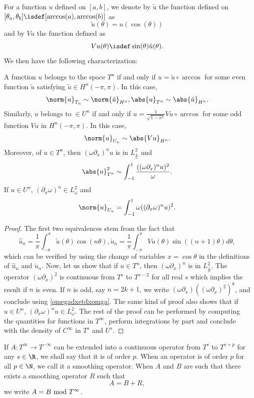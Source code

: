 \documentclass[a4paper]{article}
\begin{document}
	For a function $u$ defined on $[a,b]$, we denote by $\tilde{u}$ the function defined on $[\theta_a,\theta_b] \isdef [\arccos(a),\arccos(b)]$ as
	\[ \tilde{u}(\theta) = u(\cos(\theta))\]
	and by $Vu$ the function defined as 
	\[Vu(\theta) \isdef \sin(\theta) \tilde{u}(\theta).\]
	We then have the following characterization:
	\begin{The}
		A function $u$ belongs to the space $T^n$ if and only if $u = \tilde{u} \circ \arccos$ for some even function $\tilde{u}$ satisfying $\tilde{u}\in H^n(-\pi,\pi)$. In this case, 
		\[ \norm{u}_{T_n}\sim \norm{\tilde{u}}_{H^n}, \abs{u}_{T^n} \sim \abs{\tilde{u}}_{H^n}.\]
		Similarly, $u$ belongs to  $\in U^n$ if and only if $ u = \frac{1}{\sqrt{1 - x^2}} Vu  \circ  \arccos$  for some odd function $Vu$ in  $H^n(-\pi,\pi)$. In this case, 
		\[\norm{u}_{U_n} \sim \abs{Vu}_{H^n}.\]	
		Moreover, of $ u \in T^n$, then $(\omega \partial_x)^n u$ is in $L^2_\frac{1}{\omega}$ and 
		\[ \abs{u}_{T^n}^2 \sim \int_{-1}^{1} \frac{((\omega \partial_x)^n u)^2}{\omega}.\]
		\noindent If $u \in U^n$, $(\partial_x \omega)^n \in L^2_\omega$ and 
		\[ \norm{u}_{U_n} = \int_{-1}^{1}\omega ((\partial_x \omega)^n u)^2.\]
		\label{thmChar}
	\end{The}
	\begin{proof}
		The first two equivalences stem from the fact that 
		\[\hat{u}_n = \frac{1}{\pi}\int_{-\pi}^{\pi} \tilde{u}(\theta) \cos(n \theta), \check{u}_n = \frac{1}{\pi} \int_{-\pi}^{\pi} Vu(\theta) \sin((n+1)\theta)d\theta,\]
		which can be verified by using the change of variables $x = \cos\theta$ in the definitions of $\hat{u}_n$ and $\check{u}_n$. 
		Now, let us show that if $ u \in T^n$, then $(\omega \partial_x)^n$ is in $L^2_\frac{1}{\omega}$. The operator $(\omega \partial_x)^2$ is continuous from $T^s$ to $T^{s-2}$ for all real $s$ which implies the result if $n$ is even. If $n$ is odd, say $n = 2k + 1$, we write $(\omega \partial_x)((\omega \partial_x)^{2})^k$, and conclude using \autoref{omegadxetdxomga}.
		The same kind of proof also shows that if $u \in U^n$, $(\partial_x \omega )^nu \in L^2_\omega$.
		The rest of the proof can be performed by computing the quantities for functions in $T^{\infty}$, perform integrations by part and conclude with the density of $C^{\infty}$ in $T^s$ and $U^s$. 
	\end{proof}
	\begin{Def}
		If $A : T^{\infty} \to T^{-\infty}$ can be extended into a continuous operator from $T^{s}$ to $T^{s + p}$ for any $s \in \R$, we shall say that it is of order $p$. When an operator is of order $p$ for all $p \in \N$, we call it a smoothing operator. When $A$ and $B$ are such that there exists a smoothing operator $R$ such that 
		\[A = B + R,\]
		we write $A = B \textup{  mod  }  T^{\infty}$.
	\end{Def}
	
\end{document}
